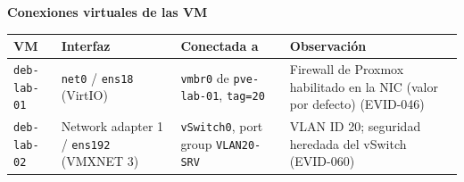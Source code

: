 \documentclass[11pt,a4paper]{article}
\newcommand{\cab}{\rowcolor{light}}
\begin{document}
\textbf{Conexiones virtuales de las VM}
{\small
\begin{longtable}{L{2.2cm} L{3.0cm} L{3.8cm} L{5.4cm}}
  \toprule
  \cab\textbf{VM} & \textbf{Interfaz} & \textbf{Conectada a} & \textbf{Observación}\\
  \midrule
  \endhead
  \texttt{deb-lab-01} & \texttt{net0} / \texttt{ens18} (VirtIO) & \texttt{vmbr0} de \texttt{pve-lab-01}, \texttt{tag=20} & Firewall de Proxmox habilitado en la NIC (valor por defecto) (EVID-046)\\
  \texttt{deb-lab-02} & Network adapter 1 / \texttt{ens192} (VMXNET 3) & \texttt{vSwitch0}, port group \texttt{VLAN20-SRV} & VLAN ID 20; seguridad heredada del vSwitch (EVID-060)\\
  \bottomrule
\end{longtable}
}
\end{document}
